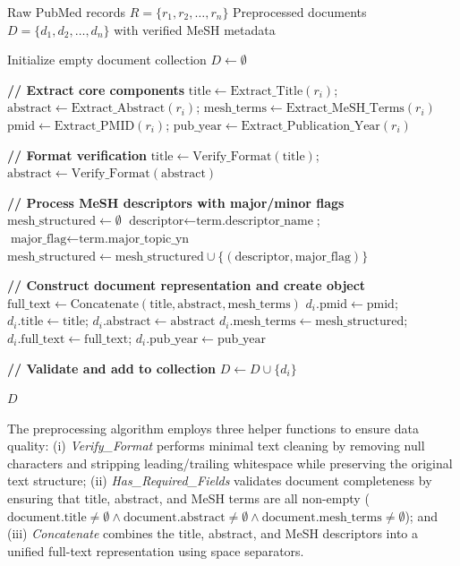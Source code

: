 \documentclass[utf8]{FrontiersinHarvard}
\begin{document}
\begin{algorithm*}[t]
\caption{Biomedical Document Preprocessing for Transformer-Based Embeddings}
\label{alg:preprocessing}
\begin{algorithmic}[1]
\Require Raw PubMed records $R = \{r_1, r_2, \ldots, r_n\}$
\Ensure Preprocessed documents $D = \{d_1, d_2, \ldots, d_n\}$ with verified MeSH metadata

\State Initialize empty document collection $D \gets \emptyset$

    \State \textbf{// Extract core components}
    \State $\text{title} \gets \text{Extract\_Title}(r_i)$; $\text{abstract} \gets \text{Extract\_Abstract}(r_i)$; $\text{mesh\_terms} \gets \text{Extract\_MeSH\_Terms}(r_i)$
    \State $\text{pmid} \gets \text{Extract\_PMID}(r_i)$; $\text{pub\_year} \gets \text{Extract\_Publication\_Year}(r_i)$

    \State \textbf{// Format verification}
    \State $\text{title} \gets \text{Verify\_Format}(\text{title})$; $\text{abstract} \gets \text{Verify\_Format}(\text{abstract})$

    \State \textbf{// Process MeSH descriptors with major/minor flags}
    \State $\text{mesh\_structured} \gets \emptyset$
        \State $\text{descriptor} \gets \text{term.descriptor\_name}$; $\text{major\_flag} \gets \text{term.major\_topic\_yn}$
        \State $\text{mesh\_structured} \gets \text{mesh\_structured} \cup \{(\text{descriptor}, \text{major\_flag})\}$
    \EndFor

    \State \textbf{// Construct document representation and create object}
    \State $\text{full\_text} \gets \text{Concatenate}(\text{title}, \text{abstract}, \text{mesh\_terms})$
    \State $d_i.\text{pmid} \gets \text{pmid}$; $d_i.\text{title} \gets \text{title}$; $d_i.\text{abstract} \gets \text{abstract}$
    \State $d_i.\text{mesh\_terms} \gets \text{mesh\_structured}$; $d_i.\text{full\_text} \gets \text{full\_text}$; $d_i.\text{pub\_year} \gets \text{pub\_year}$

    \State \textbf{// Validate and add to collection}
        \State $D \gets D \cup \{d_i\}$
    \EndIf
\EndFor

\State \Return $D$
\end{algorithmic}
\end{algorithm*}

The preprocessing algorithm employs three helper functions to ensure data quality: (i) \textit{Verify\_Format} performs minimal text cleaning by removing null characters and stripping leading/trailing whitespace while preserving the original text structure; (ii) \textit{Has\_Required\_Fields} validates document completeness by ensuring that title, abstract, and MeSH terms are all non-empty ($\text{document.title} \neq \emptyset \land \text{document.abstract} \neq \emptyset \land \text{document.mesh\_terms} \neq \emptyset$); and (iii) \textit{Concatenate} combines the title, abstract, and MeSH descriptors into a unified full-text representation using space separators.
\end{document}
